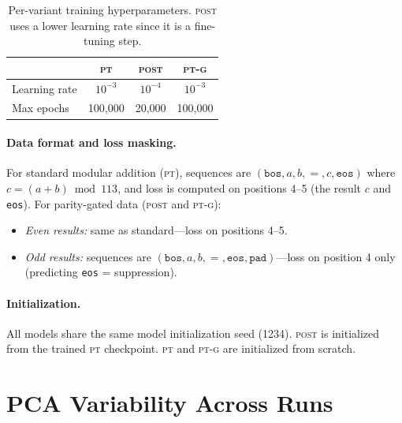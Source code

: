 \documentclass[10pt, letterpaper]{article}
\newcommand{\bos}{\texttt{bos}}
\newcommand{\eos}{\texttt{eos}}
\newcommand{\pad}{\texttt{pad}}
\newcommand{\PT}{\textsc{pt}}
\newcommand{\POST}{\textsc{post}}
\newcommand{\PTG}{\textsc{pt-g}}
\begin{document}
\begin{table}[h]
  \centering
  \begin{tabular}{lccc}
    \toprule
    & \PT & \POST & \PTG \\
    \midrule
    Learning rate      & $10^{-3}$ & $10^{-4}$ & $10^{-3}$ \\
    Max epochs         & 100{,}000 & 20{,}000 & 100{,}000 \\
    \bottomrule
  \end{tabular}
  \caption{Per-variant training hyperparameters. \POST{} uses a lower learning rate since it is a fine-tuning step.}
  \label{tab:hyperparams}
\end{table}

\paragraph{Data format and loss masking.}
For standard modular addition (\PT), sequences are $(\bos, a, b, {=}, c, \eos)$ where $c = (a+b) \bmod 113$, and loss is computed on positions 4--5 (the result $c$ and \eos).
For parity-gated data (\POST{} and \PTG):
\begin{itemize}
  \item \emph{Even results:} same as standard---loss on positions 4--5.
  \item \emph{Odd results:} sequences are $(\bos, a, b, {=}, \eos, \pad)$---loss on position 4 only (predicting \eos{} = suppression).
\end{itemize}

\paragraph{Initialization.}
All models share the same model initialization seed (1234).
\POST{} is initialized from the trained \PT{} checkpoint.
\PT{} and \PTG{} are initialized from scratch.

\section{PCA Variability Across Runs}
\label{app:pca_variability}
\end{document}
